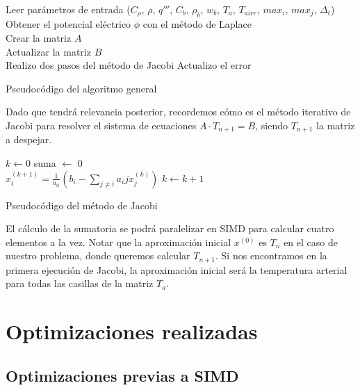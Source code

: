 \documentclass[a4paper]{article}
\begin{document}
\begin{algorithm}[H]
Leer par\'ametros de entrada ($C_{\rho}$, $\rho$, $q'''$, $C_b$, $\rho_b$, $w_b$, $T_a$, $T_{aire}$, $max_i$, $max_j$, $\Delta_t$) \\
Obtener el potencial el\'ectrico $\phi$ con el método de Laplace \\
Crear la matriz $A$ \\

 {
	Actualizar la matriz $B$ \\
	 {
		Realizo dos pasos del método de Jacobi
		Actualizo el error
	}
}
\caption{Pseudocódigo del algoritmo general}
\end{algorithm}

Dado que tendrá relevancia posterior, recordemos cómo es el método iterativo de Jacobi para resolver el sistema de ecuaciones $A \cdot T_{n+1} = B$, siendo $T_{n+1}$ la matriz a despejar.

\begin{algorithm}[H]

$k \leftarrow 0$
 {
	suma $\leftarrow$ 0 \\
	 {
		$x_i^{(k+1)} = \frac{1}{a_{ii}}(b_i - \sum_{j \neq i} {a_ij x_j^{(k)}})$
	}
	$k \leftarrow k + 1$
}
\caption{Pseudocódigo del método de Jacobi}
\end{algorithm}

El cálculo de la sumatoria se podrá paralelizar en SIMD para calcular cuatro elementos a la vez. Notar que la aproximación inicial $x^{(0)}$ es $T_n$ en el caso de nuestro problema, donde queremos calcular $T_{n+1}$. Si nos encontramos en la primera ejecución de Jacobi, la aproximación inicial será la temperatura arterial para todas las casillas de la matriz $T_a$.

\newpage

\section{Optimizaciones realizadas}

\subsection{Optimizaciones previas a SIMD}
\end{document}
